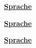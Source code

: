 \documentclass[landscape,slidestop]{slides}
\newcommand{\feedback}[2]{
\pagecolor{bg}

\begin{center}
{\Huge \textbf{\underline{#1}}}
\vspace{2em}
{\small }
\end{center}
}
\begin{document}
\begin{slide}
\feedback{Sprache}{A1}
\null
\vfill 
\end{slide}
\begin{slide}
\feedback{Sprache}{A2}
\null
\vfill
\end{slide}
\begin{slide}
\feedback{Sprache}{A3}
\null
\vfill
\end{slide}
\end{document}
